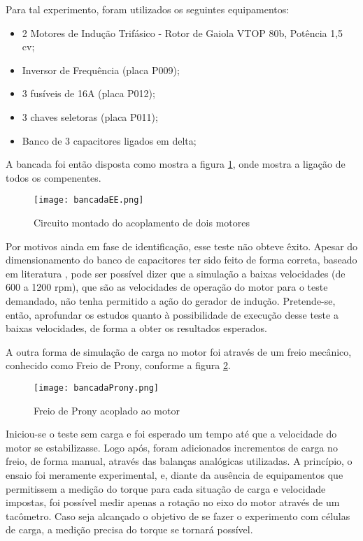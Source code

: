 			Para tal experimento, foram utilizados os seguintes equipamentos:

			\begin{itemize}
				\item 2 Motores de Indução Trifásico - Rotor de Gaiola VTOP 80b, Potência 1,5 cv;
				\item Inversor de Frequência (placa P009);
				\item 3 fusíveis de 16A (placa P012);
				\item 3 chaves seletoras (placa P011);
				\item Banco de 3 capacitores ligados em delta;
			\end{itemize}

			A bancada foi então disposta como mostra a figura \ref{bancadaEE}, onde mostra a ligação de todos os compenentes.

			\begin{figure}[!h]
				\centering
				\texttt{[image: bancadaEE.png]}
				\caption[Circuito montado do acoplamento de dois motores]{Circuito montado do acoplamento de dois motores} 
				\label{bancadaEE}
			\end{figure}

			Por motivos ainda em fase de identificação, esse teste não obteve êxito. Apesar do dimensionamento do banco de capacitores ter sido feito de forma correta, baseado em literatura \cite{Vanco}, pode ser possível dizer que a simulação a baixas velocidades (de 600 a 1200 rpm), que são as velocidades de operação do motor para o teste demandado, não tenha permitido a ação do gerador de indução. Pretende-se, então, aprofundar os estudos quanto à possibilidade de execução desse teste a baixas velocidades, de forma a obter os resultados esperados.


			A outra forma de simulação de carga no motor foi através de um freio mecânico, conhecido como Freio de Prony, conforme a figura \ref{bancadaProny}.

			\begin{figure}[!h]
				\centering
				\texttt{[image: bancadaProny.png]}
				\caption[Freio de Prony acoplado ao motor]{Freio de Prony acoplado ao motor} 
				\label{bancadaProny}
			\end{figure}

			Iniciou-se o teste sem carga e foi esperado um tempo até que a velocidade do motor se estabilizasse. Logo após, foram adicionados incrementos de carga no freio, de forma manual, através das balanças analógicas utilizadas. A princípio, o ensaio foi meramente experimental, e, diante da ausência de equipamentos que permitissem a medição do torque para cada situação de carga e velocidade impostas, foi possível medir apenas a rotação no eixo do motor através de um tacômetro. Caso seja alcançado o objetivo de se fazer o experimento com células de carga, a medição precisa do torque se tornará possível.

